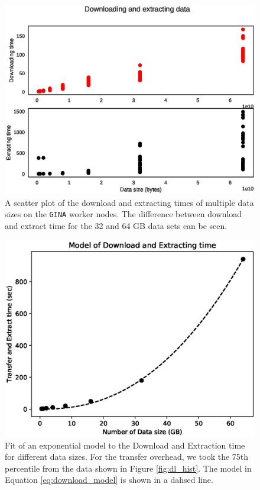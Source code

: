\begin{figure}
    \includegraphics[width=0.95\linewidth]{figures/download_extract_sct.eps}
      \caption{A scatter plot of the download and extracting times of multiple data sizes on the \texttt{GINA} worker nodes. The difference between download and extract time for the 32 and 64 GB data sets can be seen.  }
	\label{fig:dl_plot}
\end{figure}

\begin{figure}
    \includegraphics[width=0.95\linewidth]{figures/Dl_Ex_model.eps}
      \caption{Fit of an exponential model to the Download and Extraction time for different data sizes. For the transfer overhead, we took the 75th percentile from the data shown in Figure \ref{fig:dl_hist}. The model in Equation \ref{eq:download_model} is shown in a dahsed line. }
	\label{fig:dl_ex_model}
\end{figure}

